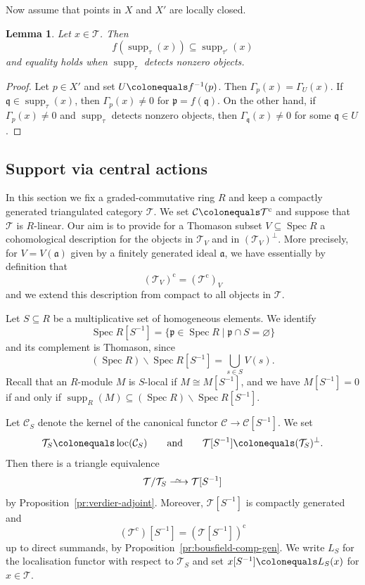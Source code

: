\documentclass{amsart}[a4]
\newtheorem{lemma}[theorem]{Lemma}
\theoremstyle{definition}
\theoremstyle{remark}
\numberwithin{equation}{section}
\newcommand{\loc}{\operatorname{loc}}
\newcommand{\Spec}{\operatorname{Spec}}
\newcommand{\supp}{\operatorname{supp}}
\newcommand{\longiso}{\xrightarrow{\
    \raisebox{-.6ex}[0ex][0ex]{$\scriptstyle{\sim}$}\ }}
\newcommand{\cat}{\mathcal}
\newcommand{\fa}{\mathfrak{a}}
\newcommand{\fp}{\mathfrak{p}}
\newcommand{\fq}{\mathfrak{q}}
\let\Gamma\varGamma
\begin{document}
Now assume that points in $X$ and $X'$ are locally closed.


\begin{lemma}\label{le:compare-supp}
  Let $x\in\cat T$. Then
  \[ f(\supp_{\tau}(x)) \subseteq\supp_{\tau'}(x)\] and equality holds
  when $\supp_{\tau}$ detects nonzero objects.
\end{lemma}
\begin{proof}
Let $p\in X'$ and set $U\colonequals f^{-1}(p)$. Then
$\Gamma_p(x)=\Gamma_U(x)$. If $\fq\in\supp_\tau(x)$, then
$\Gamma_p(x)\neq 0$ for $\fp=f(\fq)$. On the other hand, if
$\Gamma_p(x)\neq 0$ and  $\supp_{\tau}$ detects nonzero objects, then
$\Gamma_\fq(x)\neq 0$ for some $\fq\in U$.
\end{proof}


\subsection*{Support via central actions}

In this section we fix a graded-commutative ring $R$ and keep a
compactly generated triangulated category $\cat T$. We set
$\cat C\colonequals\cat T^{\mathrm c}$ and suppose that $\cat T$ is
$R$-linear. Our aim is to provide for a Thomason subset
$V\subseteq \Spec R$ a cohomological description for the objects in
$\cat T_V$ and in $(\cat T_V)^\perp$. More precisely, for
$V=V(\fa)$ given by a finitely generated ideal $\fa$,
we have essentially by definition that
\[(\cat T_V)^{\mathrm c}=(\cat T^{\mathrm c})_V\]
and we extend this description from compact to all objects in $\cat T$.

Let $S\subseteq R$ be a multiplicative set of homogeneous elements. We
identify
\[\Spec R[S^{-1}]=\{\fp\in\Spec R\mid\fp\cap S=\varnothing\}\]
and its complement is Thomason, since
\[(\Spec R)\smallsetminus \Spec R[S^{-1}]=\bigcup_{s\in S}V(s).\]
Recall that an $R$-module $M$ is $S$-local if
$M\cong M[S^{-1}]$, and we have $M[S^{-1}]=0$ if and only if
$\supp_R(M) \subseteq (\Spec R)\smallsetminus \Spec R[S^{-1}]$.

Let $\cat C_S$ denote the kernel of the
canonical functor $\cat C\to\cat C[S^{-1}]$. We set
\[\cat T_S\colonequals\loc(\cat
  C_S)\qquad\text{and}\qquad\cat T[S^{-1}]\colonequals (\cat
  T_S)^\perp.\]
Then there is a triangle equivalence
\[\cat T/\cat T_S\longiso \cat T[S^{-1}]\]
by Proposition~\ref{pr:verdier-adjoint}. Moreover, $\cat T[S^{-1}]$ is
compactly generated and
\[(\cat T^{\mathrm c})[S^{-1}]=(\cat T[S^{-1}])^{\mathrm c}\] up to
direct summands, by Proposition~\ref{pr:bousfield-comp-gen}. We write
$L_S$ for the localisation functor with respect to $\cat T_S$ and set
$x[S^{-1}]\colonequals L_S(x)$ for $x\in\cat T$.
\end{document}
